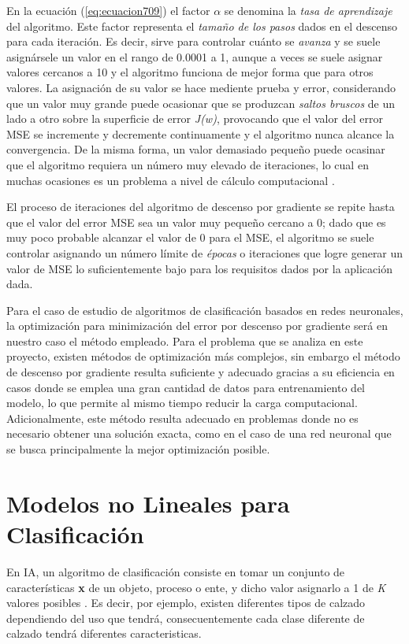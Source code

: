 En la ecuación (\ref{eq:ecuacion709}) el factor $\alpha$ se denomina la \textit{tasa de aprendizaje} del algoritmo. Este factor representa el \textit{tamaño de los pasos} dados en el descenso para cada iteración.
Es decir, sirve para controlar cuánto se \textit{avanza} y se suele asignársele un valor en el rango de 0.0001 a 1, aunque a veces se suele asignar valores cercanos a 10 y el algoritmo funciona de mejor forma que para 
otros valores. La asignación de su valor se hace mediente prueba y error, considerando que un valor muy grande puede ocasionar que se produzcan \textit{saltos bruscos} de un lado a otro sobre la superficie de error \textit{J(w)},
provocando que el valor del error MSE se incremente y decremente continuamente y el algoritmo nunca alcance la convergencia. De la misma forma, un valor demasiado pequeño puede ocasinar que el algoritmo requiera un número 
muy elevado de iteraciones, lo cual en muchas ocasiones es un problema a nivel de cálculo computacional \cite{PinedaPertuzML}.

El proceso de iteraciones del algoritmo de descenso por gradiente se repite hasta que el valor del error MSE sea un valor muy pequeño cercano a 0; dado que es muy poco probable alcanzar el valor de 0 para el MSE, el 
algoritmo se suele controlar asignando un número límite de \textit{épocas} o iteraciones que logre generar un valor de MSE lo suficientemente bajo para los requisitos dados por la aplicación dada.

Para el caso de estudio de algoritmos de clasificación basados en redes neuronales, la optimización para minimización del error por descenso por gradiente será en nuestro caso el método empleado. Para el problema que se 
analiza en este proyecto, existen métodos de optimización más complejos, sin embargo el método de descenso por gradiente resulta suficiente y adecuado gracias a su eficiencia en casos donde se emplea una gran cantidad de 
datos para entrenamiento del modelo, lo que permite al mismo tiempo reducir la carga computacional. Adicionalmente, este método resulta adecuado en problemas donde no es necesario obtener una solución exacta, como en el 
caso de una red neuronal que se busca principalmente la mejor optimización posible.

\section{Modelos no Lineales para Clasificación}

En IA, un algoritmo de clasificación consiste en tomar un conjunto de características \textbf{x} de un objeto, proceso o ente, y dicho valor asignarlo a 1 de \textit{K} valores posibles \cite{bishop}. Es decir, por ejemplo, 
existen diferentes tipos de calzado dependiendo del uso que tendrá, consecuentemente cada clase diferente de calzado tendrá diferentes caracteristicas.

